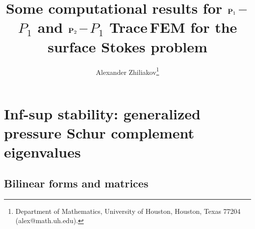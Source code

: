 \documentclass[12pt]{article}
\title{Some computational results for $\boldsymbol{\mathbf{P}}_1$\,--\,$P_1$ and $\boldsymbol{\mathbf{P}}_2$\,--\,$P_1$ Trace\,FEM for the surface Stokes problem}
\author{
	Alexander Zhiliakov\thanks{Department of Mathematics, University of Houston, Houston, Texas 77204 (alex@math.uh.edu).}
}
\begin{document}
	
\maketitle

\tableofcontents
	
\let\oldtabular\tabular
\renewcommand{\tabular}[1][1.5]{\def\arraystretch{#1}\oldtabular}

\section{Inf-sup stability: generalized pressure Schur complement eigenvalues}

\subsection{Bilinear forms and matrices}
\end{document}
